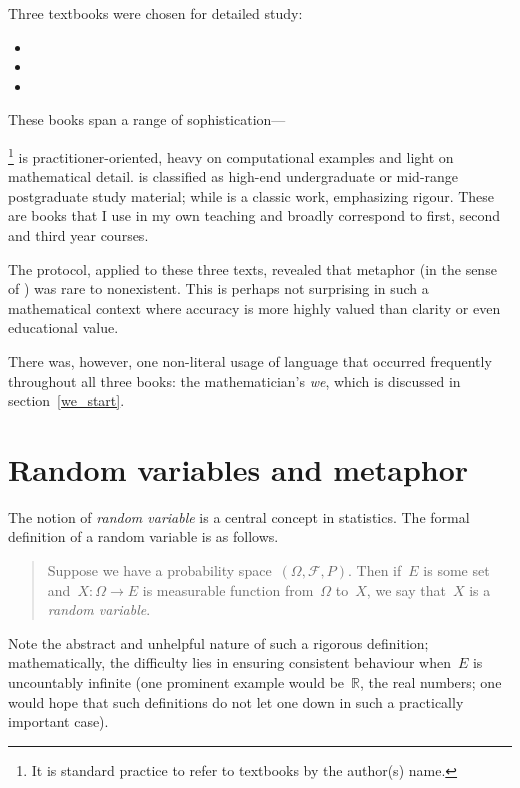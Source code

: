 Three textbooks were chosen for detailed study:

\begin{itemize}
\item {}
\item {}
\item {}
\end{itemize}

These books span a range of
sophistication---\citeauthor{crawley2015}

\footnote{It is standard practice to refer to textbooks by the
  author(s) name.} is practitioner-oriented, heavy on computational
examples and light on mathematical detail.  \citeauthor{casella2001}
is classified as high-end undergraduate or mid-range postgraduate
study material; while \citeauthor{feller1968} is a classic work,
emphasizing rigour.  These are books that I use in my own teaching and
broadly correspond to first, second and third year courses.

The  protocol, applied to these three texts,
revealed that metaphor (in the sense of ) was rare
to nonexistent.  This is perhaps not surprising in such a mathematical
context where accuracy is more highly valued than clarity or even
educational value.

There was, however, one non-literal usage of language that occurred
frequently throughout all three books: the mathematician's \emph{we},
which is discussed in section~\ref{we_start}.

\section{Random variables and metaphor}

The notion of \emph{random variable} is a central concept in
statistics.  The formal definition of a random variable is as follows.

\begin{quote}
Suppose we have a probability
space~$\left({\Omega,\mathcal{F},P}\right)$.  Then if~$E$ is some set
and~$X\colon\Omega\longrightarrow E$ is measurable function
from~$\Omega$ to~$X$, we say that~$X$ is a {\em random variable}.
\end{quote}

\noindent
Note the abstract and unhelpful nature of such a rigorous definition;
mathematically, the difficulty lies in ensuring consistent behaviour
when~$E$ is uncountably infinite (one prominent example would
be~$\mathbb{R}$, the real numbers; one would hope that such
definitions do not let one down in such a practically important case).

